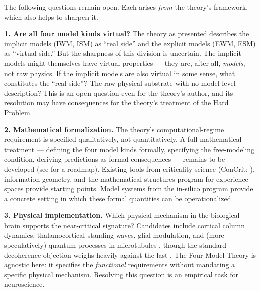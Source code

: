 \documentclass[12pt]{article}
\begin{document}
The following questions remain open. Each arises \emph{from} the theory's framework, which also helps to sharpen it.

\textbf{1. Are all four model kinds virtual?} The theory as presented describes the implicit models (IWM, ISM) as ``real side'' and the explicit models (EWM, ESM) as ``virtual side.'' But the sharpness of this division is uncertain. The implicit models might themselves have virtual properties --- they are, after all, \emph{models}, not raw physics. If the implicit models are also virtual in some sense, what constitutes the ``real side''? The raw physical substrate with no model-level description? This is an open question even for the theory's author, and its resolution may have consequences for the theory's treatment of the Hard Problem.

\textbf{2. Mathematical formalization.} The theory's computational-regime requirement is specified qualitatively, not quantitatively. A full mathematical treatment --- defining the four model kinds formally, specifying the free-modeling condition, deriving predictions as formal consequences --- remains to be developed (see \citealp{Gruber2026b} for a roadmap). Existing tools from criticality science (ConCrit; \citealp{AlgomShriki2026}), information geometry, and the mathematical-structures program for experience spaces \citep{Kleiner2024} provide starting points. Model systems from the in-silico program provide a concrete setting in which these formal quantities can be operationalized.

\textbf{3. Physical implementation.} Which physical mechanism in the biological brain supports the near-critical signature? Candidates include cortical column dynamics, thalamocortical standing waves, glial modulation, and (more speculatively) quantum processes in microtubules \citep{HameroffPenrose1996}, though the standard decoherence objection weighs heavily against the last \citep{Tegmark2000}. The Four-Model Theory is agnostic here: it specifies the \emph{functional} requirements without mandating a specific physical mechanism. Resolving this question is an empirical task for neuroscience.
\end{document}
